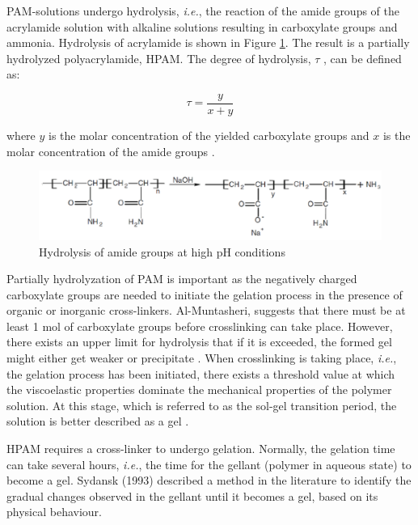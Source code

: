 PAM-solutions undergo hydrolysis, \textit{i.e.}, the reaction of the amide groups of the acrylamide solution with alkaline solutions resulting in carboxylate groups and ammonia. Hydrolysis of acrylamide is shown in Figure \ref{fig:amideHydrol}. The result is a partially hydrolyzed polyacrylamide,  HPAM. The degree of hydrolysis, $\tau$ , can be defined as:

\begin{equation}
    \tau = \frac{y}{x+y}
\end{equation}							

where $y$ is the molar concentration of the yielded carboxylate groups and $x$ is the molar concentration of the amide groups \citep{Al-Muntasheri2012}.

\begin{figure}
    \centering
    \includegraphics[width=\textwidth]{img/fig/amideHydrol.png}
    \caption{Hydrolysis of amide groups at high pH conditions \citep{Al-muntasheri2008}}
    \label{fig:amideHydrol} %
\end{figure}

Partially hydrolyzation of PAM is important as the negatively charged carboxylate groups are needed to initiate the gelation process in the presence of organic or inorganic cross-linkers. Al-Muntasheri, suggests that there must be at least 1 mol of carboxylate groups before crosslinking can take place. However, there exists an upper limit for hydrolysis that if it is exceeded, the formed gel might either get weaker or precipitate \citep{Al-Muntasheri2007}. When crosslinking is taking place, \textit{i.e.}, the gelation process has been initiated, there exists a threshold value at which the viscoelastic properties dominate the mechanical properties of the polymer solution. At this stage, which is referred to as the sol-gel transition period, the solution is better described as a gel \citep{Albonico1994}.

HPAM requires a cross-linker  to undergo gelation. Normally, the gelation time can take several hours, \textit{i.e.}, the time for the gellant (polymer in aqueous state) to become a gel. \cite{Sydansk1993} Sydansk (1993) described a method in the literature to identify the gradual changes observed in the gellant until it becomes a gel, based on its physical behaviour.

